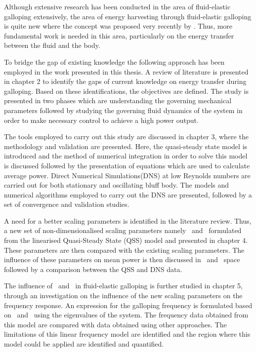 Although extensive research has been conducted in the area of fluid-elastic galloping extensively, the area of energy harvesting through fluid-elastic galloping is quite new where the concept was proposed very recently by \citet{Barrero-Gil2010a}. Thus, more fundamental work is needed in this area, particularly on the energy transfer between the fluid and the body.   
 
To bridge the gap of existing knowledge the following approach has been employed in the work presented in this thesis. A review of literature is presented in chapter 2 to identify the gaps of current knowledge on energy transfer during galloping. Based on these identifications, the objectives are defined. The study is presented in two phases which are understanding the governing mechanical parameters followed by studying the governing fluid dynamics of the system in order to make necessary control to achieve a high power output.  

The tools employed to carry out this study are discussed in chapter 3, where the methodology and validation are presented. Here, the quasi-steady state model is introduced and the method of numerical integration in order to solve this model is discussed followed by the presentation of equations which are used to calculate average power. Direct Numerical Simulations(DNS) at low Reynolds numbers are carried out for both stationary and  oscillating bluff body. The models and numerical algorithms employed to carry out the DNS are presented, followed by a set of convergence and validation studies.  

A need for a better scaling parameters is identified in the literature review. Thus, a new set of non-dimensionalised scaling parameters namely \massstiff\ and \massdamp\ formulated from the linearised Quasi-Steady State (QSS) model and presented in chapter 4. These parameters are then compared with the existing scaling parameters. The influence of these parameters on mean power is then discussed in \massstiff\ and \massdamp\ space followed by a comparison between the QSS and DNS data.

The influence of \massstiff\ and \massdamp\ in fluid-elastic galloping is further studied in chapter 5, through an investigation on the influence of the new scaling parameters on the frequency response. An expression for the galloping frequency is formulated based on \massstiff\ and \massdamp\ using the eigenvalues of the system. The frequency data obtained from this model are compared with data obtained using other approaches. The limitations of this linear frequency model are identified and the region where this model could be applied are identified and quantified.

